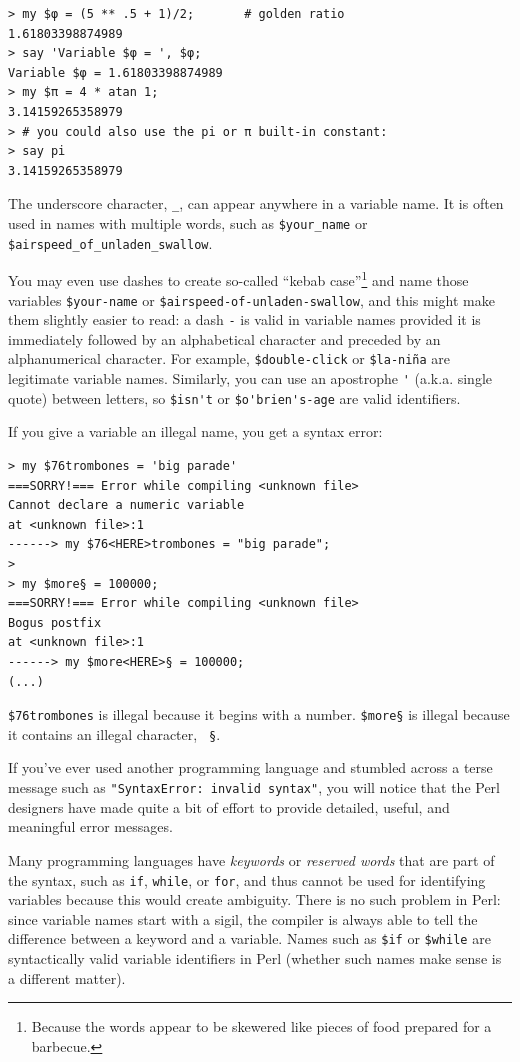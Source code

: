 \begin{verbatim}
> my $φ = (5 ** .5 + 1)/2;       # golden ratio
1.61803398874989
> say 'Variable $φ = ', $φ;
Variable $φ = 1.61803398874989
> my $π = 4 * atan 1; 
3.14159265358979
> # you could also use the pi or π built-in constant:
> say pi
3.14159265358979
\end{verbatim}

The underscore character, \verb"_", can appear anywhere in a variable name.
It is often used in names with multiple words, such as 
\verb"$your_name" or \verb"$airspeed_of_unladen_swallow". 

You may even use dashes to create so-called 
``kebab case''\footnote{Because the 
words appear to be skewered like pieces of food prepared for 
a barbecue.} and name those variables 
\verb"$your-name" or \verb"$airspeed-of-unladen-swallow", and this 
might make them slightly easier to read: a dash \verb'-' is 
valid in variable names provided it is immediately followed by an 
alphabetical character and preceded by an alphanumerical character. 
For example, \verb"$double-click" or \verb"$la-niña" are legitimate 
variable names. Similarly, you can use an apostrophe \verb"'" 
(a.k.a. single quote) between letters, so \verb"$isn't" or 
\verb"$o'brien's-age" are valid identifiers.


If you give a variable an illegal name, you get a syntax error:

\begin{verbatim}
> my $76trombones = 'big parade'
===SORRY!=== Error while compiling <unknown file>
Cannot declare a numeric variable
at <unknown file>:1
------> my $76<HERE>trombones = "big parade";
>
> my $more§ = 100000;
===SORRY!=== Error while compiling <unknown file>
Bogus postfix
at <unknown file>:1
------> my $more<HERE>§ = 100000;
(...)
\end{verbatim}
%
{\tt \$76trombones} is illegal because it begins with a number.
{\tt \$more§} is illegal because it contains an illegal character, {\tt
§}. 

If you've ever used another programming language and stumbled 
across a terse message such as {\tt"SyntaxError: invalid syntax"}, 
you will notice that the Perl designers have made quite a bit 
of effort to provide detailed, useful, and meaningful error 
messages. 

Many programming languages have \emph{keywords} or \emph{reserved 
words} that are part of the syntax, such as {\tt if}, {\tt while}, 
or {\tt for}, and thus cannot be used for identifying variables 
because this would create ambiguity. There is no such problem 
in Perl: since variable names start with a sigil, the compiler 
is always able to tell the difference between a keyword and a 
variable. Names such as {\tt \$if} or {\tt \$while} are 
syntactically valid variable identifiers in Perl (whether 
such names make sense is a different matter).




